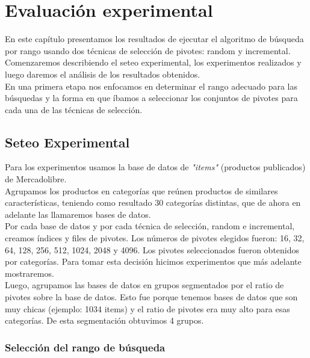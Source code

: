 \chapter{Evaluaci\'on experimental}


En este cap\'itulo presentamos los resultados de ejecutar el algoritmo de b\'usqueda por rango usando dos t\'ecnicas de selecci\'on de pivotes: random y incremental.\\

Comenzaremos describiendo el seteo experimental, los experimentos realizados y luego daremos el an\'alisis de los resultados obtenidos.\\

En una primera etapa nos enfocamos en determinar el rango adecuado para las b\'usquedas y la forma en que \'ibamos a seleccionar los conjuntos de pivotes para cada una de las t\'ecnicas de selecci\'on.\\

\section{Seteo Experimental}

Para los experimentos usamos la base de datos de \textit{"items"} (productos publicados) de Mercadolibre.\\
	
Agrupamos los productos en categor\'ias que re\'unen productos de similares caracter\'isticas, teniendo como resultado 30 categor\'ias distintas, que de  ahora en adelante las llamaremos bases de datos.\\

Por cada base de datos y por cada t\'ecnica de selecci\'on, random e incremental, creamos \'indices y files de pivotes. Los n\'umeros de pivotes elegidos fueron: 16, 32, 64, 128, 256, 512, 1024, 2048 y 4096. Los pivotes seleccionados fueron obtenidos por categor\'ias. Para tomar esta decisi\'on hicimos experimentos que m\'as adelante mostraremos.\\

Luego, agrupamos las bases de datos en grupos segmentados por el ratio de pivotes sobre la base de datos. Esto fue porque tenemos bases de datos que son muy chicas (ejemplo: 1034 items) y el ratio de pivotes era muy alto para esas categor\'ias. De esta segmentaci\'on obtuvimos 4 grupos.\\


\subsection{Selecci\'on del rango de b\'usqueda}

